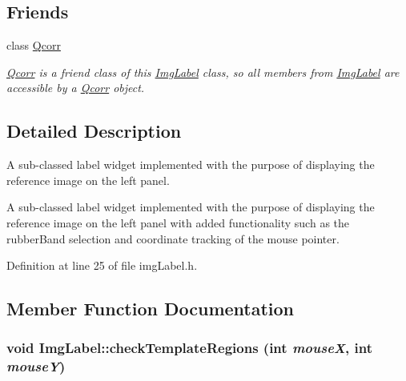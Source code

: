 \subsection*{Friends}
\begin{CompactItemize}
\item 
\hypertarget{classImgLabel_e86bc9b92f374c5f78097881af49364d}{
class \hyperlink{classImgLabel_e86bc9b92f374c5f78097881af49364d}{Qcorr}}
\label{classImgLabel_e86bc9b92f374c5f78097881af49364d}

\begin{CompactList}\small\item\em \hyperlink{classQcorr}{Qcorr} is a friend class of this \hyperlink{classImgLabel}{ImgLabel} class, so all members from \hyperlink{classImgLabel}{ImgLabel} are accessible by a \hyperlink{classQcorr}{Qcorr} object. \item\end{CompactList}\end{CompactItemize}


\subsection{Detailed Description}
A sub-classed label widget implemented with the purpose of displaying the reference image on the left panel. 

A sub-classed label widget implemented with the purpose of displaying the reference image on the left panel with added functionality such as the rubberBand selection and coordinate tracking of the mouse pointer. 

Definition at line 25 of file imgLabel.h.

\subsection{Member Function Documentation}
\hypertarget{classImgLabel_a71c0202c48be349b4fb0813891df43a}{
\subsubsection[{checkTemplateRegions}]{\setlength{\rightskip}{0pt plus 5cm}void ImgLabel::checkTemplateRegions (int {\em mouseX}, \/  int {\em mouseY})}}
\label{classImgLabel_a71c0202c48be349b4fb0813891df43a}


